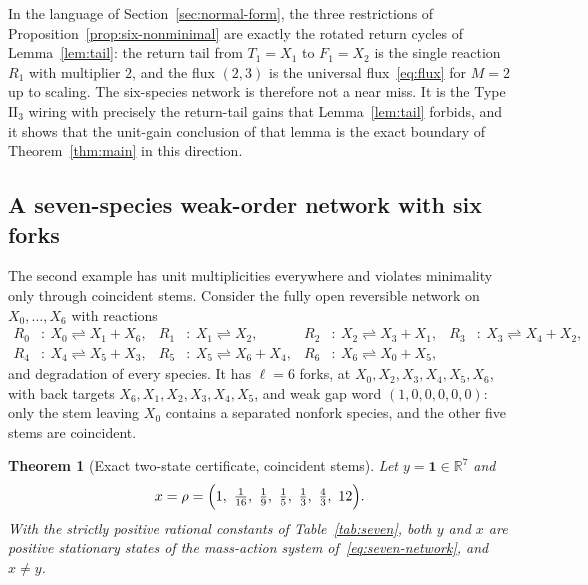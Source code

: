 \documentclass[11pt,reqno]{amsart}
\theoremstyle{plain}
\newtheorem{theorem}{Theorem}[section]
\theoremstyle{definition}
\theoremstyle{remark}
\numberwithin{equation}{section}
\newcommand{\R}{\mathbb{R}}
\newcommand{\one}{\mathbf{1}}
\begin{document}
In the language of Section~\ref{sec:normal-form}, the three restrictions of Proposition~\ref{prop:six-nonminimal} are exactly the rotated return cycles of Lemma~\ref{lem:tail}: the return tail from $T_1=X_1$ to $F_1=X_2$ is the single reaction $R_1$ with multiplier $2$, and the flux $(2,3)$ is the universal flux~\eqref{eq:flux} for $M=2$ up to scaling.  The six-species network is therefore not a near miss.  It is the Type $\mathrm{II}_3$ wiring with precisely the return-tail gains that Lemma~\ref{lem:tail} forbids, and it shows that the unit-gain conclusion of that lemma is the exact boundary of Theorem~\ref{thm:main} in this direction.

\subsection{A seven-species weak-order network with six forks}\label{subsec:seven}
The second example has unit multiplicities everywhere and violates minimality only through coincident stems.  Consider the fully open reversible network on $X_0,\dots,X_6$ with reactions
\begin{equation}\label{eq:seven-network}
\begin{aligned}
R_0&:\ X_0\rightleftharpoons X_1+X_6, & R_1&:\ X_1\rightleftharpoons X_2, & R_2&:\ X_2\rightleftharpoons X_3+X_1, & R_3&:\ X_3\rightleftharpoons X_4+X_2,\\
R_4&:\ X_4\rightleftharpoons X_5+X_3, & R_5&:\ X_5\rightleftharpoons X_6+X_4, & R_6&:\ X_6\rightleftharpoons X_0+X_5,
\end{aligned}
\end{equation}
and degradation of every species.  It has $\ell=6$ forks, at $X_0,X_2,X_3,X_4,X_5,X_6$, with back targets $X_6,X_1,X_2,X_3,X_4,X_5$, and weak gap word $(1,0,0,0,0,0)$: only the stem leaving $X_0$ contains a separated nonfork species, and the other five stems are coincident.

\begin{theorem}[Exact two-state certificate, coincident stems]\label{thm:sevenspecies}
Let $y=\one\in\R^7$ and
\[
x=\rho=\Bigl(1,\ \tfrac1{16},\ \tfrac19,\ \tfrac15,\ \tfrac13,\ \tfrac43,\ 12\Bigr).
\]
With the strictly positive rational constants of Table~\ref{tab:seven}, both $y$ and $x$ are positive stationary states of the mass-action system of~\eqref{eq:seven-network}, and $x\ne y$.
\end{theorem}
\end{document}
